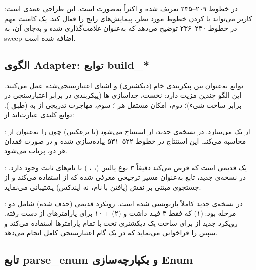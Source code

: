  در خطوط ۲۰۹–۲۴۵ تعریف شده و اکثراً به‌صورت  است. این طراحی عمدی است: کاربر می‌تواند با  کردن خطوط مورد نظر، پیمایش‌های رایج را فعال کند. یک کامنت مهم در خطوط ۲۳۰–۲۳۶ توضیح می‌دهد که  به‌عنوان  علامت‌گذاری شده و به‌جای آن،  به sweep اضافه شده است.

\subsection{الگوی Adapter: توابع build\_*}

توابع  به‌عنوان  بین پیکربندی خام (دیکشنری) و اشیای  اعتبارسنجی‌شده عمل می‌کنند. این الگو چندین مزیت دارد: نخست، جداسازی ها (پیکربندی در برابر اعتبارسنجی در برابر ساخت شیء)؛ دوم، امکان  مستقل هر ؛ سوم، مهاجرت تدریجی از  به  (طبق ). توابع کلیدی عبارت‌اند از:

: از  یک  می‌سازد. در نسخه‌ی جدید،  از  استنتاج می‌شود (یا برعکس) چون   را به‌عنوان  از  محاسبه می‌کند. این استنتاج در خطوط ۵۲۲–۵۳۱ پیاده‌سازی شده و در صورت فقدان هر دو،  پرتاب می‌شود.

: یک  قدیمی است که فرض می‌کند دقیقاً ۳ نوع پالس (، ، ) با نام‌های ثابت وجود دارد. در نسخه‌ی جدید، تابع  به‌عنوان مسیر ترجیحی معرفی شده که از  استفاده می‌کند و از جستجوی مبتنی بر نقش (یافتن  با نام، نه ایندکس) پشتیبانی می‌نماید.

: در نسخه‌ی جدید کاملاً بازنویسی شده است. رویکرد قدیمی (حذف شده) شامل دو مرحله بود: (۱)  که فقط ۳ فیلد داشت و (۲)  + ۱۰  برای پارامترهای از دست رفته. رویکرد جدید از  برای ساخت یک دیکشنری تخت با تمام پارامترها استفاده می‌کند و سپس  را فراخوانی می‌نماید که در یک گام اعتبارسنجی کامل انجام می‌دهد.

\subsection{تابع parse\_enum و یکپارچه‌سازی Enum}

